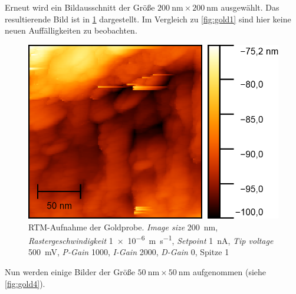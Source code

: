 Erneut wird ein Bildausschnitt der Größe $\SI{200}{\nano \meter} \times \SI{200}{\nano \meter}$ ausgewählt. Das resultierende Bild ist in \cref{fig:gold3}
dargestellt. Im Vergleich zu \cref{fig:gold1} sind hier keine neuen Auffälligkeiten zu beobachten.
\begin{figure}[H]
	\centering
	\includegraphics[width=0.6\linewidth]{../figs/Gold10468.png}
	\caption{RTM-Aufnahme der Goldprobe. \textit{Image size} \SI{200}{\nano \meter}, \textit{Rastergeschwindigkeit} \SI{1e-6}{\meter \per \second}, \textit{Setpoint} \SI{1}{\nano \ampere},
    \textit{Tip voltage} \SI{500}{\milli \volt}, \textit{P-Gain} \num{1000}, \textit{I-Gain} \num{2000}, \textit{D-Gain} \num{0}, Spitze 1}
	\label{fig:gold3}
\end{figure} Nun werden einige Bilder der Größe $\SI{50}{\nano \meter} \times \SI{50}{\nano \meter}$ aufgenommen (siehe \cref{fig:gold4}).
